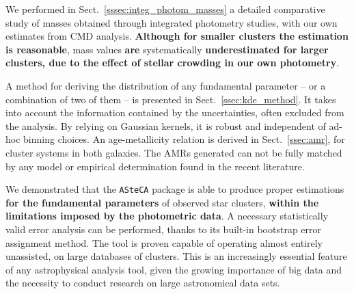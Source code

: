 \documentclass{aa}
\begin{document}
We performed in Sect.~\ref{sssec:integ_photom_masses} a detailed comparative
study of masses obtained through integrated photometry studies, with our own
estimates from CMD analysis.
\textbf{Although for smaller clusters the estimation is reasonable}, mass values
\textbf{are} systematically \textbf{underestimated for larger
clusters, due to the effect of stellar crowding in our own photometry}.

A method for deriving the distribution of any fundamental parameter -- or a
combination of two of them -- is presented in Sect.~\ref{ssec:kde_method}. It
takes into account the information contained by the uncertainties, often
excluded from the analysis. By relying on Gaussian kernels, it is robust and
independent of ad-hoc binning choices.
%
An age-metallicity relation is derived in Sect.~\ref{ssec:amr}, for
cluster systems in both galaxies. The AMRs generated can not be fully matched by
any model or empirical determination found in the recent literature.

We demonstrated that the \texttt{ASteCA} package is able to produce proper
estimations \textbf{for the fundamental parameters} of observed star clusters,
\textbf{within the limitations imposed by the photometric data}.
A necessary statistically valid error analysis
can be performed, thanks to its built-in bootstrap error assignment method.
%
The tool is proven capable of operating almost entirely unassisted, on large
databases of clusters. This is an increasingly essential feature
of any astrophysical analysis tool, given the growing importance of big data and
the necessity to conduct research on large astronomical data sets.




\end{document}
